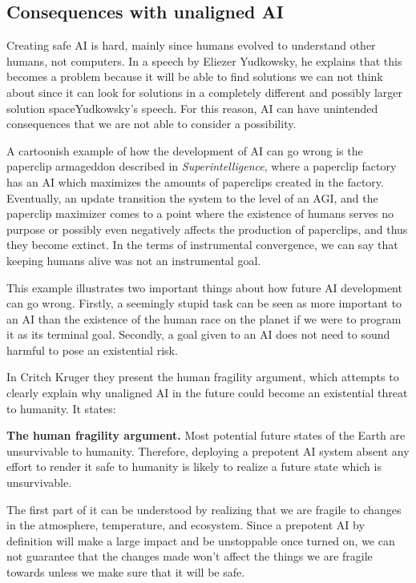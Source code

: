 \documentclass[12pt,A4]{report}
\newcommand{\autobaj}{}
\theoremstyle{definition}
\begin{document}
\subsection{Consequences with unaligned AI}
Creating safe AI is hard, mainly since humans evolved to understand other humans, not computers. In a speech by Eliezer Yudkowsky, he explains that this becomes a problem because it will be able to find solutions we can not think about since it can look for solutions in a completely different and possibly larger solution space\autobaj{Yudkowsky's speech}. For this reason, AI can have unintended consequences that we are not able to consider a possibility. 

A cartoonish example of how the development of AI can go wrong is the paperclip armageddon described in \textit{Superintelligence}, where a paperclip factory has an AI which maximizes the amounts of paperclips created in the factory. Eventually, an update transition the system to the level of an AGI, and the paperclip maximizer comes to a point where the existence of humans serves no purpose or possibly even negatively affects the production of paperclips, and thus they become extinct. In the terms of instrumental convergence, we can say that keeping humans alive was not an instrumental goal. 

This example illustrates two important things about how future AI development can go wrong. Firstly, a seemingly stupid task can be seen as more important to an AI than the existence of the human race on the planet if we were to program it as its terminal goal. Secondly, a goal given to an AI does not need to sound harmful to pose an existential risk. 

In \autobaj{Critch Kruger} they present the human fragility argument, which attempts to clearly explain why unaligned AI in the future could become an existential threat to humanity. It states:
\begin{displayquote}
\textbf{The human fragility argument.} 
Most potential future states of the Earth are unsurvivable to humanity. Therefore, deploying a prepotent AI system absent any effort to render it safe to humanity is likely to realize a future state which is unsurvivable. 
\end{displayquote}
The first part of it can be understood by realizing that we are fragile to changes in the atmosphere, temperature, and ecosystem. Since a prepotent AI by definition will make a large impact and be unstoppable once turned on, we can not guarantee that the changes made won't affect the things we are fragile towards unless we make sure that it will be safe. 
\end{document}
